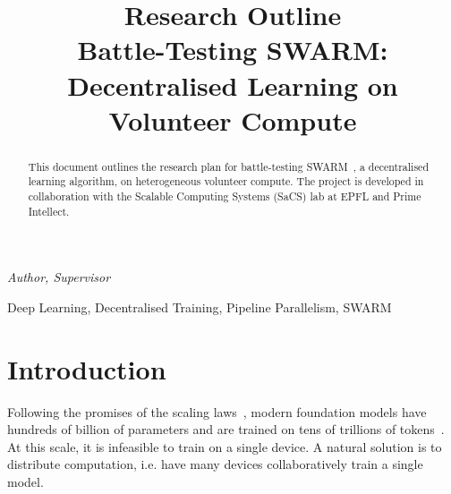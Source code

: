 \documentclass[conference, 10pt]{IEEEtran}
\begin{document}
\title{
  {\Large Research Outline}\\\vspace{1pt}
  {\LARGE Battle-Testing SWARM: Decentralised Learning on Volunteer Compute}
}

\author{
  \and
  \and
  \and
}

\maketitle

{\small\itshape {} Author,  Supervisor}

\begin{abstract} 
  This document outlines the research plan for battle-testing
  SWARM~\cite{ryabinin2023}, a decentralised learning algorithm, on
  heterogeneous volunteer compute. The project is developed in collaboration
  with the Scalable Computing Systems (SaCS) lab at EPFL and Prime Intellect.
\end{abstract}

\begin{IEEEkeywords}
Deep Learning, Decentralised Training, Pipeline Parallelism, SWARM
\end{IEEEkeywords}

\section{Introduction} 

Following the promises of the scaling laws~\cite{kaplan2020,hoffmann2022},
modern foundation models have hundreds of billion of parameters and are trained
on tens of trillions of
tokens~\cite{brown2023,touvron2023,dubey2024,openai2024,chowdhery2022,geminiteam2024}.
At this scale, it is infeasible to train on a single device. A natural solution
is to distribute computation, i.e. have many devices collaboratively train a
single model.
\end{document}
